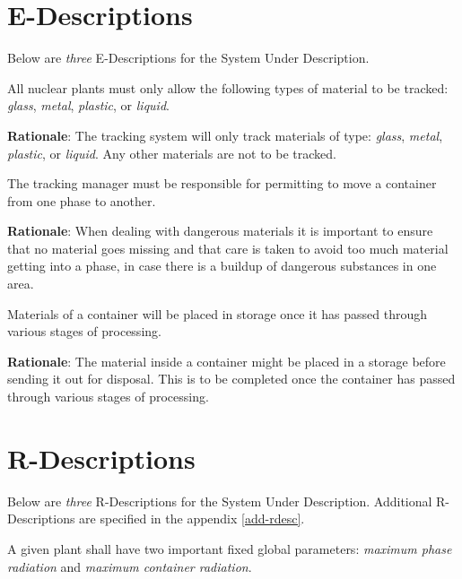 \newpage
\section{E-Descriptions}

Below are \textit{three} E-Descriptions for the System Under Description.

\edescription
{All nuclear plants must only allow the following types of material to be tracked: \textit{glass}, \textit{metal}, \textit{plastic}, or \textit{liquid}.\\}
{}
\label{E1}

\smallskip
\noindent \textbf{Rationale}: The tracking system will only track materials of type: \textit{glass}, \textit{metal}, \textit{plastic}, or \textit{liquid}. Any other materials are not to be tracked.

\edescription
{The tracking manager must be responsible for permitting to move a container from one phase to another.\\}
{}
\label{E2}

\smallskip
\noindent \textbf{Rationale}: When dealing with dangerous materials it is important to ensure that no material goes missing and that care is taken to avoid too much material getting into a phase, in case there is a buildup of dangerous substances in one area.

\edescription
{Materials of a container will be placed in storage once it has passed through various stages of processing.\\}
{}
\label{E2}

\smallskip
\noindent \textbf{Rationale}: The material inside a container might be placed in a storage before sending it out for disposal. This is to be completed once the container has passed through various stages of processing.



\newpage
\section{R-Descriptions}

Below are \textit{three} R-Descriptions for the System Under Description. Additional R-Descriptions are specified in the appendix \ref{add-rdesc}.


\rdescription
{A given plant shall have two important fixed global parameters: \textit{maximum phase radiation} and \textit{maximum container radiation}.\\}
{}
\label{R1}


